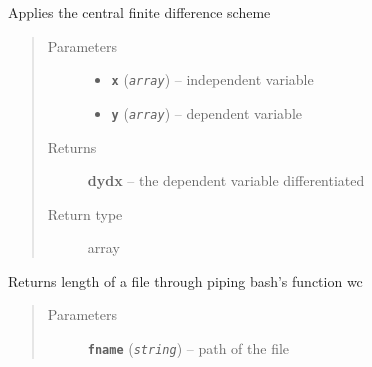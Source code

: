 \documentclass[a4paper,10pt,oneside]{sphinxmanual}
\begin{document}
\begin{fulllineitems}
\label{pymicra.algs:pymicra.algs.general.diff_central}
Applies the central finite difference scheme
\begin{quote}\begin{description}
\item[{Parameters}] \leavevmode\begin{itemize}
\item {} 
\textbf{\texttt{x}} (\emph{\texttt{array}}) -- independent variable

\item {} 
\textbf{\texttt{y}} (\emph{\texttt{array}}) -- dependent variable

\end{itemize}

\item[{Returns}] \leavevmode
\textbf{dydx} -- the dependent variable differentiated

\item[{Return type}] \leavevmode
array

\end{description}\end{quote}

\end{fulllineitems}


\begin{fulllineitems}
\label{pymicra.algs:pymicra.algs.general.file_len}
Returns length of a file through piping bash's function wc
\begin{quote}\begin{description}
\item[{Parameters}] \leavevmode
\textbf{\texttt{fname}} (\emph{\texttt{string}}) -- path of the file

\end{description}\end{quote}

\end{fulllineitems}

\end{document}
